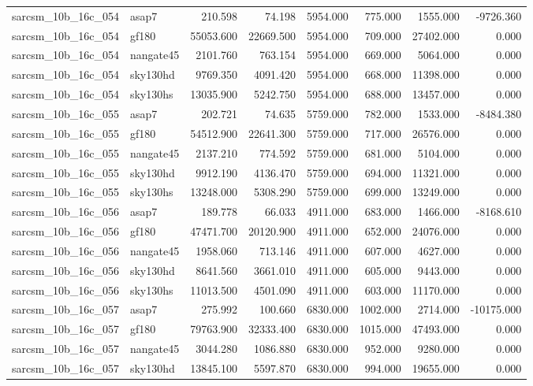 \begin{tabular}{llrrrrrr}
sarcsm\_10b\_16c\_054 & asap7 & 210.598 & 74.198 & 5954.000 & 775.000 & 1555.000 & -9726.360 \\
sarcsm\_10b\_16c\_054 & gf180 & 55053.600 & 22669.500 & 5954.000 & 709.000 & 27402.000 & 0.000 \\
sarcsm\_10b\_16c\_054 & nangate45 & 2101.760 & 763.154 & 5954.000 & 669.000 & 5064.000 & 0.000 \\
sarcsm\_10b\_16c\_054 & sky130hd & 9769.350 & 4091.420 & 5954.000 & 668.000 & 11398.000 & 0.000 \\
sarcsm\_10b\_16c\_054 & sky130hs & 13035.900 & 5242.750 & 5954.000 & 688.000 & 13457.000 & 0.000 \\
sarcsm\_10b\_16c\_055 & asap7 & 202.721 & 74.635 & 5759.000 & 782.000 & 1533.000 & -8484.380 \\
sarcsm\_10b\_16c\_055 & gf180 & 54512.900 & 22641.300 & 5759.000 & 717.000 & 26576.000 & 0.000 \\
sarcsm\_10b\_16c\_055 & nangate45 & 2137.210 & 774.592 & 5759.000 & 681.000 & 5104.000 & 0.000 \\
sarcsm\_10b\_16c\_055 & sky130hd & 9912.190 & 4136.470 & 5759.000 & 694.000 & 11321.000 & 0.000 \\
sarcsm\_10b\_16c\_055 & sky130hs & 13248.000 & 5308.290 & 5759.000 & 699.000 & 13249.000 & 0.000 \\
sarcsm\_10b\_16c\_056 & asap7 & 189.778 & 66.033 & 4911.000 & 683.000 & 1466.000 & -8168.610 \\
sarcsm\_10b\_16c\_056 & gf180 & 47471.700 & 20120.900 & 4911.000 & 652.000 & 24076.000 & 0.000 \\
sarcsm\_10b\_16c\_056 & nangate45 & 1958.060 & 713.146 & 4911.000 & 607.000 & 4627.000 & 0.000 \\
sarcsm\_10b\_16c\_056 & sky130hd & 8641.560 & 3661.010 & 4911.000 & 605.000 & 9443.000 & 0.000 \\
sarcsm\_10b\_16c\_056 & sky130hs & 11013.500 & 4501.090 & 4911.000 & 603.000 & 11170.000 & 0.000 \\
sarcsm\_10b\_16c\_057 & asap7 & 275.992 & 100.660 & 6830.000 & 1002.000 & 2714.000 & -10175.000 \\
sarcsm\_10b\_16c\_057 & gf180 & 79763.900 & 32333.400 & 6830.000 & 1015.000 & 47493.000 & 0.000 \\
sarcsm\_10b\_16c\_057 & nangate45 & 3044.280 & 1086.880 & 6830.000 & 952.000 & 9280.000 & 0.000 \\
sarcsm\_10b\_16c\_057 & sky130hd & 13845.100 & 5597.870 & 6830.000 & 994.000 & 19655.000 & 0.000 \\

\end{tabular}

